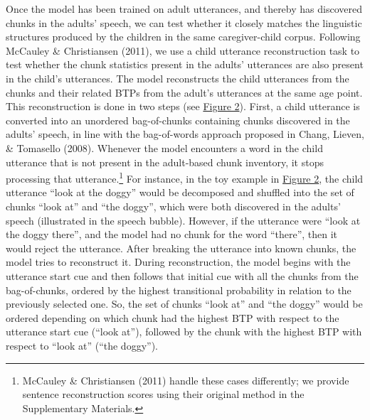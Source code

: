 \documentclass[man,mask,floatsintext]{apa6}
\theoremstyle{definition}
\theoremstyle{definition}
\theoremstyle{definition}
\theoremstyle{remark}
\begin{document}
Once the model has been trained on adult utterances, and thereby has
discovered chunks in the adults' speech, we can test whether it closely
matches the linguistic structures produced by the children in the same
caregiver-child corpus. Following McCauley \& Christiansen (2011), we
use a child utterance reconstruction task to test whether the chunk
statistics present in the adults' utterances are also present in the
child's utterances. The model reconstructs the child utterances from the
chunks and their related BTPs from the adult's utterances at the same
age point. This reconstruction is done in two steps (see
\protect\hyperlink{fig2}{Figure 2}). First, a child utterance is
converted into an unordered bag-of-chunks containing chunks discovered
in the adults' speech, in line with the bag-of-words approach proposed
in Chang, Lieven, \& Tomasello (2008). Whenever the model encounters a
word in the child utterance that is not present in the adult-based chunk
inventory, it stops processing that utterance.\footnote{McCauley \&
  Christiansen (2011) handle these cases differently; we provide
  sentence reconstruction scores using their original method in the
  Supplementary Materials.} For instance, in the toy example in
\protect\hyperlink{fig2}{Figure 2}, the child utterance \enquote{look at
the doggy} would be decomposed and shuffled into the set of chunks
\enquote{look at} and \enquote{the doggy}, which were both discovered in
the adults' speech (illustrated in the speech bubble). However, if the
utterance were \enquote{look at the doggy there}, and the model had no
chunk for the word \enquote{there}, then it would reject the utterance.
After breaking the utterance into known chunks, the model tries to
reconstruct it. During reconstruction, the model begins with the
utterance start cue and then follows that initial cue with all the
chunks from the bag-of-chunks, ordered by the highest transitional
probability in relation to the previously selected one. So, the set of
chunks \enquote{look at} and \enquote{the doggy} would be ordered
depending on which chunk had the highest BTP with respect to the
utterance start cue (\enquote{look at}), followed by the chunk with the
highest BTP with respect to \enquote{look at} (\enquote{the doggy}).
\end{document}
